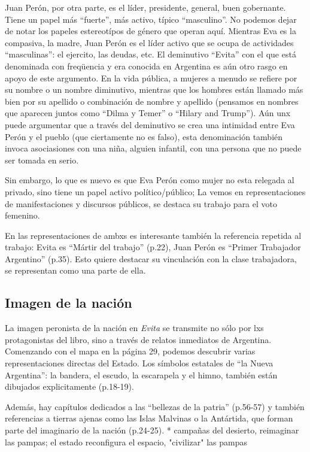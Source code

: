 Juan Perón, por otra parte, es el líder, presidente, general, buen gobernante.
Tiene un papel más ``fuerte'', más activo, típico ``masculino''.
No podemos dejar de notar los papeles estereotípos de género que operan aquí.
Mientras Eva es la compasiva, la madre, Juan Perón es el líder activo que se ocupa de actividades ``masculinas'': el ejercito, las deudas, etc.
El deminutivo ``Evita'' con el que está denominada con freqüencia y era conocida en Argentina es aún otro rasgo en apoyo de este argumento.
En la vida pública, a mujeres a menudo se refiere por su nombre o un nombre diminutivo, mientras que los hombres están llamado más bien por su apellido o combinación de nombre y apellido (pensamos en nombres que aparecen juntos como ``Dilma y Temer'' o ``Hilary and Trump'').
Aún unx puede argumentar que a través del deminutivo se crea una intimidad entre Eva Perón y el pueblo (que ciertamente no es falso),
esta denominación también invoca asociasiones con una niña, alguien infantil, con una persona que no puede ser tomada en serio.

Sin embargo, lo que es nuevo es que Eva Perón como mujer no esta relegada al privado, sino tiene un papel activo político/público;
La vemos en representaciones de manifestaciones y discursos públicos, se destaca su trabajo para el voto femenino.

En las representaciones de ambxs es interesante también la referencia repetida al trabajo:
Evita es ``Mártir del trabajo'' (p.22),
Juan Perón es ``Primer Trabajador Argentino'' (p.35).
Esto quiere destacar su vinculación con la clase trabajadora, se representan como una parte de ella.


\subsection{Imagen de la nación}

La imagen peronista de la nación en \textit{Evita} se transmite no sólo por lxs protagonistas del libro, sino a través de relatos inmediatos de Argentina.
Comenzando con el mapa en la página 29, podemos descubrir varias representaciones directas del Estado.
Los símbolos estatales de ``la Nueva Argentina'': la bandera, el escudo, la escarapela y el himno, también están dibujados explicitamente (p.18-19).

Además, hay capítulos dedicados a las ``bellezas de la patria'' (p.56-57) y también referencias a tierras ajenas como las Islas Malvinas o la Antártida, que forman parte del imaginario de la nación (p.24-25).
    * campañas del desierto, reimaginar las pampas; el estado reconfigura el espacio, "civilizar" las pampas

